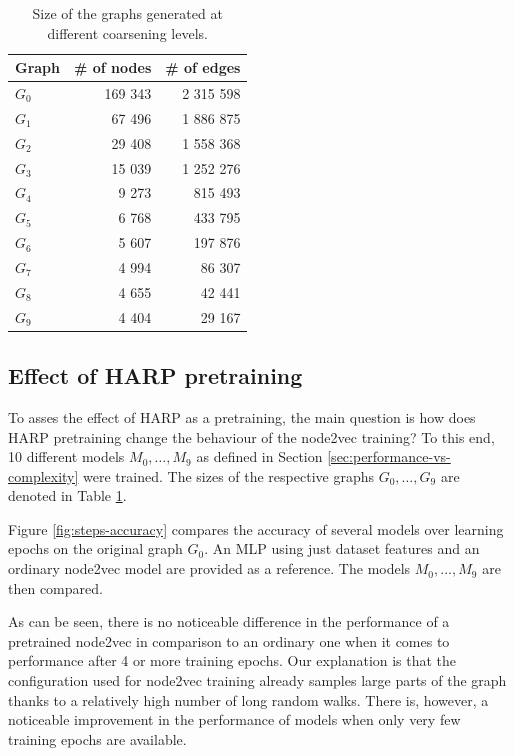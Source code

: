 \begin{table}
  \centering
  \begin{tabular}{lrr}
    \toprule
    Graph     & \# of nodes & \# of edges \\
    \midrule
    \( G_0 \) & 169 343     & 2 315 598   \\
    \( G_1 \) & 67 496      & 1 886 875   \\
    \( G_2 \) & 29 408      & 1 558 368   \\
    \( G_3 \) & 15 039      & 1 252 276   \\
    \( G_4 \) & 9 273       & 815 493     \\
    \( G_5 \) & 6 768       & 433 795     \\
    \( G_6 \) & 5 607       & 197 876     \\
    \( G_7 \) & 4 994       & 86 307      \\
    \( G_8 \) & 4 655       & 42 441      \\
    \( G_9 \) & 4 404       & 29 167      \\
  \end{tabular}
  \caption{Size of the graphs generated at different coarsening levels.}\label{tab:graph-sizes}
\end{table}

\subsection{Effect of HARP pretraining}

To asses the effect of HARP as a pretraining, the main question is how does HARP pretraining change the behaviour of the node2vec training? To this end, 10 different models \( M_0, \dots, M_9 \) as defined in Section \ref{sec:performance-vs-complexity} were trained. The sizes of the respective graphs \( G_0, \dots, G_9 \) are denoted in Table \ref{tab:graph-sizes}.

Figure \ref{fig:steps-accuracy} compares the accuracy of several models over learning epochs on the original graph \( G_0 \). An MLP using just dataset features and an ordinary node2vec model are provided as a reference. The models \( M_0, \dots, M_9 \) are then compared.

As can be seen, there is no noticeable difference in the performance of a pretrained node2vec in comparison to an ordinary one when it comes to performance after 4 or more training epochs. Our explanation is that the configuration used for node2vec training already samples large parts of the graph thanks to a relatively high number of long random walks. There is, however, a noticeable improvement in the performance of models when only very few training epochs are available.

